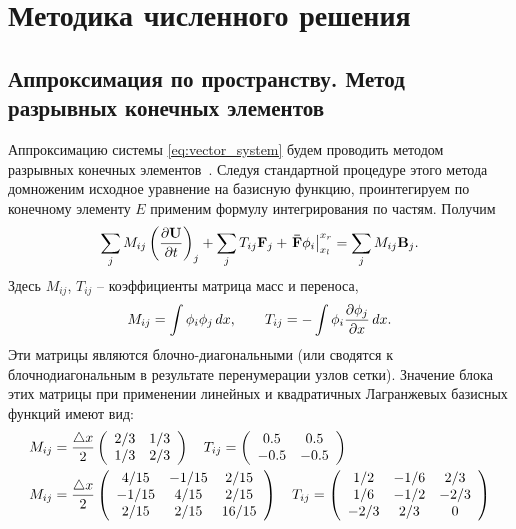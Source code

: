 
\section{Методика численного решения}
\subsection{Аппроксимация по пространству. Метод разрывных конечных элементов}
Аппроксимацию системы 
\cref{eq:vector_system}
будем проводить методом разрывных конечных элементов~\cite{dipietro2012}.
Следуя стандартной процедуре этого метода домноженим
исходное уравнение на базисную функцию,
проинтегируем по конечному элементу $E$
применим формулу интегрирования по частям.
Получим
\begin{equation*}
\sum\limits_j M_{ij} \left(\frac{\partial \boldsymbol{\rm U}}{\partial t}\right)_j 
+ \sum\limits_j T_{ij} \boldsymbol{\rm F}_j + \left.\boldsymbol{\rm \bar F} \phi_i \right|_{x_l}^{x_r}
= 
\sum\limits_j M_{ij} \boldsymbol{\rm B}_j.
\end{equation*}
Здесь $M_{ij}$, $T_{ij}$ -- коэффициенты матрица масс и переноса, 
\begin{equation}
\nonumber
M_{ij} = \int\phi_i\phi_j\, dx,
\qquad
T_{ij} = -\int\phi_i\frac{\partial \phi_j}{\partial x}\, dx.
\end{equation}
Эти матрицы являются блочно-диагональными (или сводятся к блочнодиагональным
в результате перенумерации узлов сетки).
Значение блока этих матрицы при применении линейных и квадратичных
Лагранжевых базисных функций имеют вид:
\begin{align*}
&M_{ij} = \frac{\triangle x}{2}\left(\begin{array}{cc}
2/3 & 1/3\\
1/3 & 2/3\\
\end{array}\right)
\quad
T_{ij} = \left(\begin{array}{cc}
0.5 & 0.5 \\ -0.5 & -0.5
\end{array}\right)
\\
&M_{ij} = \frac{\triangle x}{2}\left(\begin{array}{ccc}
	4 / 15 & -1 / 15 &  2 / 15 \\
	-1 / 15 &  4 / 15 &  2 / 15 \\
	2 / 15 &  2 / 15 & 16 / 15
\end{array}\right)
\quad
T_{ij} = \left(\begin{array}{ccc}
1 / 2 & -1 / 6 & 2 / 3\\
1 / 6 & -1 / 2 & -2 / 3\\
-2 / 3 & 2 / 3 & 0
\end{array}\right)
\end{align*}
